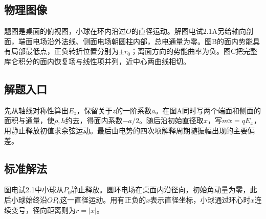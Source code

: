 \documentclass[UTF8,fontset=fandol,a4paper,11pt]{ctexart}
\begin{document}


\subsection*{物理图像}

题图是桌面的俯视图，小球在环内沿过$O$的直径运动。解图电试2.1A另给轴向剖面，端面电场沿外法线、侧面电场朝圆柱内部，总电通量为零。图B的面内势能具有局部最低点，正负转折位置分别为$\pm r_0$；离面方向的势能曲率为负。图C把完整库仑积分的面内恢复场与线性项并列，近中心两曲线相切。



\subsection*{解题入口}

先从轴线对称性算出$E_z$，保留关于$z$的一阶系数$a$。在图A同时写两个端面和侧面的面积与通量，使$\rho,h$约去，得面内系数$-a/2$。随后沿初始直径取$x$，写$m\ddot x=qE_x$，用静止释放初值求余弦运动。最后由电势的四次项解释周期随振幅出现的主要偏差。



\subsection*{标准解法}


图电试2.1中小球从$P_0$静止释放。圆环电场在桌面内沿径向，初始角动量为零，此后小球始终沿$OP_0$这一直径运动。用有正负的$x$表示直径坐标，小球通过环心时$x$连续变号，径向距离则为$r=|x|$。
\end{document}

